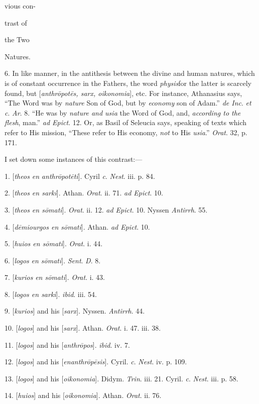 vious con-

trast of

the Two

Natures.

6. In like manner, in
the antithesis between the divine and human natures, which is
of constant occurrence in the Fathers, the word \emph{physis}for
the latter is scarcely found, but [\emph{anthr\={o}pot\={e}s,
sarx, oikonomia}], etc. For instance, Athanasius says, ``The
Word was by \emph{nature} Son of God, but by \emph{economy}
son of Adam.'' \emph{de Inc}. \emph{et c}. \emph{Ar}. 8. ``He
was by \emph{nature and usia} the Word of God, and, \emph{according
to the flesh}, man.'' \emph{ad Epict}. 12. Or, as Basil of
Seleucia says, speaking of texts which refer to His mission, ``These
refer to His economy, \emph{not} to His \emph{usia}.'' \emph{Orat}.
32, p. 171.

I set down some
instances of this contrast:—

1. [\emph{theos en} \emph{anthr\={o}pot\={e}ti}]. Cyril \emph{c}.
\emph{Nest}. iii. p. 84.

2. [\emph{theos en sarki}]. Athan. \emph{Orat}. ii. 71. \emph{ad
Epict}. 10.

3. [\emph{theos en s\={o}mati}]. \emph{Orat}. ii. 12. \emph{ad
Epict}. 10. Nyssen \emph{Antirrh}. 55.

4. [\emph{d\={e}miourgos en s\={o}mati}]. Athan. \emph{ad
Epict}. 10.

5. [\emph{huios en s\={o}mati}]. \emph{Orat}. i. 44.

6. [\emph{logos} \emph{en s\={o}mati}]. \emph{Sent}. \emph{D}.
8.

7. [\emph{kurios} \emph{en s\={o}mati}]. \emph{Orat}. i.
43.

8. [\emph{logos en sarki}]. \emph{ibid}. iii. 54.

9. [\emph{kurios}] and his [\emph{sarx}]. Nyssen. \emph{Antirrh}.
44.

10. [\emph{logos}] and his [\emph{sarx}].
Athan. \emph{Orat}. i. 47. iii. 38.

11. [\emph{logos}]
and his [\emph{anthr\={o}pos}]. \emph{ibid}. iv. 7.

12. [\emph{logos}] and his [\emph{enanthr\={o}p\={e}sis}].
Cyril. \emph{c}. \emph{Nest}. iv. p. 109.

13. [\emph{logos}] and his [\emph{oikonomia}]. Didym. \emph{Trin}.
iii. 21. Cyril. \emph{c}. \emph{Nest}. iii. p. 58.

14. [\emph{huios}] and his [\emph{oikonomia}]. Athan. \emph{Orat}.
ii. 76.

